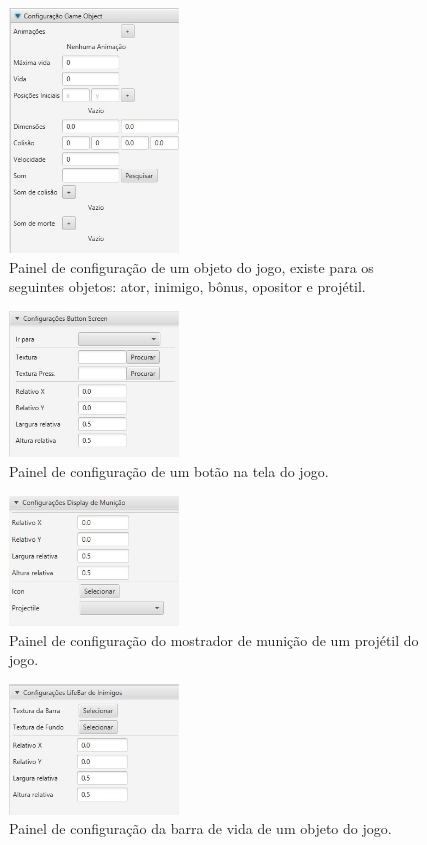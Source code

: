 \documentclass[12pt,oneside,openright,a4paper,english,brazil,sumario=tradicional]{abntex2}
\begin{document}
\begin{figure}[h]
\centering
\includegraphics[width=0.4\textwidth]{images/configurar-obj-1.jpg}
\caption{Painel de configuração de um objeto do jogo, existe para os seguintes objetos: ator, inimigo, bônus, opositor e projétil. }
\label{fig:configurar-obj-1}
\end{figure}
\begin{figure}[h]
\centering
\includegraphics[width=0.4\textwidth]{images/configurar-botao-1.jpg}
\caption{Painel de configuração de um botão na tela do jogo.}
\label{fig:configurar-botao-1}
\end{figure}
\begin{figure}[h]
\centering
\includegraphics[width=0.4\textwidth]{images/configurar-municao-1.jpg}
\caption{Painel de configuração do mostrador de munição de um projétil do jogo.}
\label{fig:configurar-municao-1}
\end{figure}
\begin{figure}[h]
\centering
\includegraphics[width=0.4\textwidth]{images/configurar-vida-1.jpg}
\caption{Painel de configuração da barra de vida de um objeto do jogo.}
\label{fig:configurar-vida-1}
\end{figure}
\end{document}

